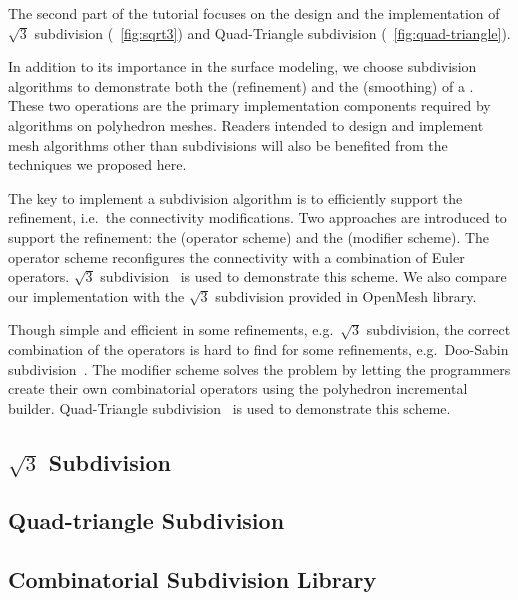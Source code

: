 The second part of the tutorial focuses on the design and the
implementation of $\sqrt{3}$ subdivision (\figurename\ \ref{fig:sqrt3}) 
and Quad-Triangle subdivision (\figurename\ \ref{fig:quad-triangle}).  

In addition to its importance in the surface modeling, we 
choose subdivision algorithms to demonstrate both the 
 (refinement) and the
 (smoothing) of a
\cgalpoly . These two operations are the
primary implementation components required by algorithms on
polyhedron meshes. Readers intended to design and implement
mesh algorithms other than subdivisions will also be benefited
from the techniques we proposed here.

The key to implement a subdivision algorithm is to 
efficiently support the refinement, i.e.\ the connectivity 
modifications. Two approaches are introduced to support the 
refinement: the  (operator scheme) and
the  (modifier scheme). 
The operator scheme reconfigures the connectivity with a 
combination of Euler operators. $\sqrt{3}$ subdivision~\cite{sqrt3} is
used to demonstrate this scheme. We also compare our implementation
with the $\sqrt{3}$ subdivision provided in OpenMesh library.

Though simple and efficient in some
refinements, e.g.\ $\sqrt{3}$ subdivision, the correct combination of
the operators is hard to find for some refinements, e.g.\ Doo-Sabin
subdivision~\cite{ds}. The modifier scheme solves the problem by
letting the programmers create their own combinatorial operators 
using the polyhedron incremental builder. Quad-Triangle
subdivision~\cite{qts,l-pg-03} is used to demonstrate this scheme.

\subsection{$\sqrt{3}$ Subdivision}


\subsection{Quad-triangle Subdivision}


\subsection{Combinatorial Subdivision Library}



